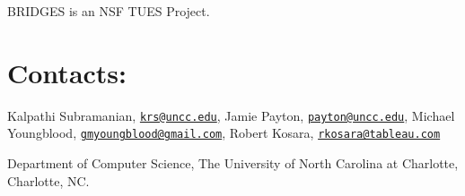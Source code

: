 B\+R\+I\+D\+G\+ES is an N\+SF T\+U\+ES Project.\hypertarget{index_contacts_sec}{}\section{Contacts\+:}\label{index_contacts_sec}
Kalpathi Subramanian, \href{mailto:krs@uncc.edu}{\tt krs@uncc.\+edu}, Jamie Payton, \href{mailto:payton@uncc.edu}{\tt payton@uncc.\+edu}, Michael Youngblood, \href{mailto:gmyoungblood@gmail.com}{\tt gmyoungblood@gmail.\+com}, Robert Kosara, \href{mailto:rkosara@tableau.com}{\tt rkosara@tableau.\+com}

Department of Computer Science, The University of North Carolina at Charlotte, Charlotte, NC. 